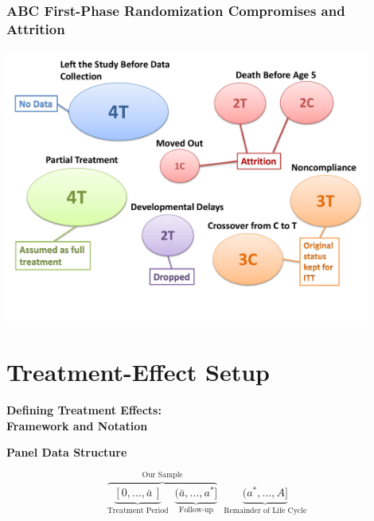\documentclass[static]{JJH-Beamer}
\begin{document}
\clearpage

\frametitle{ABC First-Phase Randomization Compromises and Attrition}

\begin{center}
\includegraphics[width=0.9\textwidth]{images/abc_p1_randomization.pdf}
\end{center}

\section{Treatment-Effect Setup}

\begin{frame}

\begin{block}{}
\begin{center}
\textbf{Defining Treatment Effects:} \\
\textbf{Framework and Notation}
\end{center}
\end{block}

\end{frame}

\begin{frame}

\begin{center}
\textbf{Panel Data Structure}
\end{center}

\begin{equation*}
\overbrace{\underbrace{[0,...,\bar{a}\,]}_{\text{Treatment Period}} \;\; \underbrace{(\bar{a},...,a^{\ast}]}_{\text{Follow-up}}}^{\text{Our Sample}} \;\; \underbrace{(a^{\ast},...,A]}_{\text{Remainder of Life Cycle}}
\end{equation*}

\end{frame}
\end{document}
